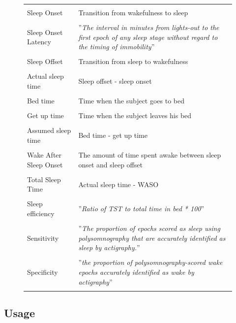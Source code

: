 \documentclass[a4paper,12pt]{article}
\begin{document}
\begin{figure}[H]
\centering
\begin{tabularx}{\textwidth}{|X|X|}
\hline
& \\
Sleep Onset & Transition from wakefulness to sleep \\
& \\
Sleep Onset Latency & ''\textit{The interval in minutes from lights-out to the first epoch of any sleep stage without regard to the timing of immobility}''\cite{Chae2009} \\
& \\
Sleep Offset & Transition from sleep to wakefulness \\
& \\
Actual sleep time & Sleep offset - sleep onset \\
& \\
Bed time & Time when the subject goes to bed \\
& \\
Get up time & Time when the subject leaves his bed \\
& \\
Assumed sleep time & Bed time - get up time \\
& \\
Wake After Sleep Onset & The amount of time spent awake between sleep onset and sleep offset \\
& \\
Total Sleep Time & Actual sleep time - WASO \\
& \\
Sleep efficiency & ''\textit{Ratio of TST to total time in bed * 100}''\cite{Paquet2007} \\
& \\
Sensitivity & ''\textit{The proportion of epochs scored as sleep using polysomnography that are accurately identified as sleep by actigraphy.}''\cite{LisaJ.MeltzerHawleyE.Montgomery-DownsSalvatoreP.Insana2012} \\
& \\
Specificity & ''\textit{the proportion of polysomnography-scored wake epochs accurately identified as wake by actigraphy}''\cite{LisaJ.MeltzerHawleyE.Montgomery-DownsSalvatoreP.Insana2012} \\
& \\
\hline

\end{tabularx}


\end{figure}


\subsection{Usage}
\end{document}
